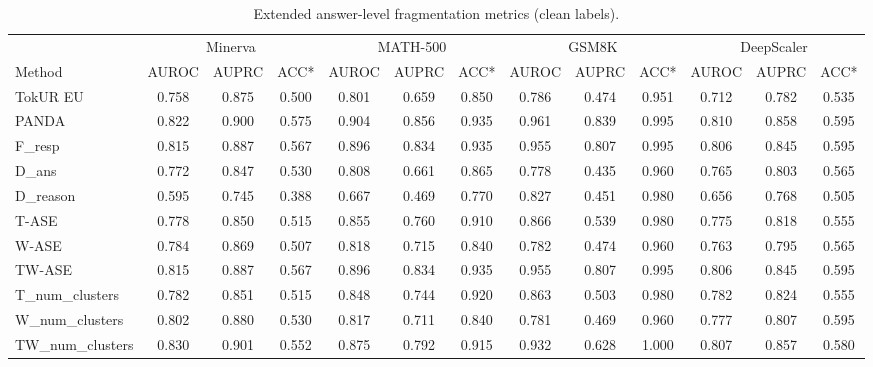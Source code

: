 \begin{table}[t]
\centering
\caption{Extended answer-level fragmentation metrics (clean labels).}
\label{tab:extended}
\small
\begin{tabular}{l|ccc|ccc|ccc|ccc}
\toprule
 & \multicolumn{3}{c}{Minerva} & \multicolumn{3}{c}{MATH-500} & \multicolumn{3}{c}{GSM8K} & \multicolumn{3}{c}{DeepScaler} \\
\cmidrule(lr){2-4} \cmidrule(lr){5-7} \cmidrule(lr){8-10} \cmidrule(lr){11-13}
Method & AUROC & AUPRC & ACC* & AUROC & AUPRC & ACC* & AUROC & AUPRC & ACC* & AUROC & AUPRC & ACC* \\
\midrule
TokUR EU & 0.758 & 0.875 & 0.500 & 0.801 & 0.659 & 0.850 & 0.786 & 0.474 & 0.951 & 0.712 & 0.782 & 0.535 \\ \midrule
PANDA & 0.822 & 0.900 & 0.575 & 0.904 & 0.856 & 0.935 & 0.961 & 0.839 & 0.995 & 0.810 & 0.858 & 0.595 \\
F\_resp & 0.815 & 0.887 & 0.567 & 0.896 & 0.834 & 0.935 & 0.955 & 0.807 & 0.995 & 0.806 & 0.845 & 0.595 \\
D\_ans & 0.772 & 0.847 & 0.530 & 0.808 & 0.661 & 0.865 & 0.778 & 0.435 & 0.960 & 0.765 & 0.803 & 0.565 \\
D\_reason & 0.595 & 0.745 & 0.388 & 0.667 & 0.469 & 0.770 & 0.827 & 0.451 & 0.980 & 0.656 & 0.768 & 0.505 \\
T-ASE & 0.778 & 0.850 & 0.515 & 0.855 & 0.760 & 0.910 & 0.866 & 0.539 & 0.980 & 0.775 & 0.818 & 0.555 \\
W-ASE & 0.784 & 0.869 & 0.507 & 0.818 & 0.715 & 0.840 & 0.782 & 0.474 & 0.960 & 0.763 & 0.795 & 0.565 \\
TW-ASE & 0.815 & 0.887 & 0.567 & 0.896 & 0.834 & 0.935 & 0.955 & 0.807 & 0.995 & 0.806 & 0.845 & 0.595 \\
T\_num\_clusters & 0.782 & 0.851 & 0.515 & 0.848 & 0.744 & 0.920 & 0.863 & 0.503 & 0.980 & 0.782 & 0.824 & 0.555 \\
W\_num\_clusters & 0.802 & 0.880 & 0.530 & 0.817 & 0.711 & 0.840 & 0.781 & 0.469 & 0.960 & 0.777 & 0.807 & 0.595 \\
TW\_num\_clusters & 0.830 & 0.901 & 0.552 & 0.875 & 0.792 & 0.915 & 0.932 & 0.628 & 1.000 & 0.807 & 0.857 & 0.580 \\
\bottomrule
\end{tabular}
\end{table}
